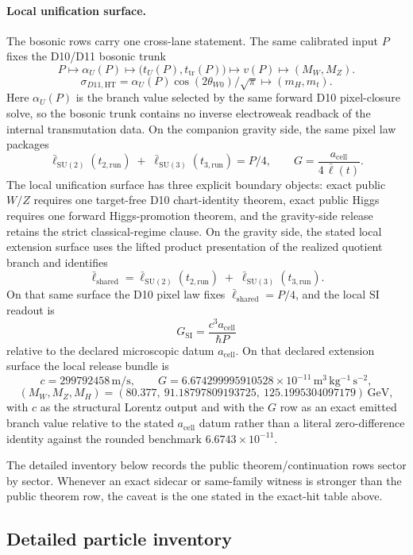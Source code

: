 \documentclass[11pt]{article}
\newcommand{\ellbar}{\bar{\ell}}
\begin{document}
\paragraph{Local unification surface.}
The bosonic rows carry one cross-lane statement. The same calibrated input \(P\) fixes the
D10/D11 bosonic trunk
\[
P
\longmapsto
\alpha_U(P)
\longmapsto
\bigl(t_U(P),t_{\mathrm{tr}}(P)\bigr)
\longmapsto
v(P)
\longmapsto
\left(M_W,M_Z\right).
\]
\[
\sigma_{D11,\mathrm{HT}}
=
\alpha_U(P)\cos(2\theta_{W0})/\sqrt{\pi}
\longmapsto
\left(m_H,m_t\right).
\]
Here \(\alpha_U(P)\) is the branch value selected by the same forward D10 pixel-closure solve, so
the bosonic trunk contains no inverse electroweak readback of the internal transmutation data.
On the companion gravity side, the same pixel law packages
\[
\ellbar_{\mathrm{SU(2)}}(t_{2,\mathrm{run}})
\;+\;
\ellbar_{\mathrm{SU(3)}}(t_{3,\mathrm{run}})
=
P/4,
\qquad
G=\frac{a_{\mathrm{cell}}}{4\,\ellbar(t)}.
\]
The local unification surface has three explicit boundary objects: exact public \(W/Z\) requires
one target-free D10 chart-identity theorem, exact public Higgs requires one forward
Higgs-promotion theorem, and the gravity-side release retains the strict classical-regime clause.
On the gravity side, the stated local extension surface uses the lifted product presentation of the
realized quotient branch and identifies
\[
\ellbar_{\mathrm{shared}}
=
\ellbar_{\mathrm{SU(2)}}(t_{2,\mathrm{run}})
\;+\;
\ellbar_{\mathrm{SU(3)}}(t_{3,\mathrm{run}}).
\]
On that same surface the D10 pixel law fixes \(\ellbar_{\mathrm{shared}}=P/4\),
and the local SI readout is
\[
G_{\mathrm{SI}}=\frac{c^3 a_{\mathrm{cell}}}{\hbar P}
\]
relative to the declared microscopic datum \(a_{\mathrm{cell}}\). On that declared extension
surface the local release bundle is
\[
c=299792458\,\mathrm{m/s},
\qquad
G=6.674299995910528\times10^{-11}\,\mathrm{m^3\,kg^{-1}\,s^{-2}},
\]
\[
(M_W,M_Z,M_H)=
(80.377,\ 91.18797809193725,\ 125.1995304097179)\,\mathrm{GeV},
\]
with \(c\) as the structural Lorentz output and with the \(G\) row as an exact emitted branch
value relative to the stated \(a_{\mathrm{cell}}\) datum rather than a literal zero-difference identity against the rounded benchmark
\(6.6743\times10^{-11}\).

The detailed inventory below records the public theorem/continuation rows sector by sector. Whenever an exact sidecar or same-family witness is stronger than the public theorem row, the caveat is the one stated in the exact-hit table above.

\subsection{Detailed particle inventory}
\end{document}
